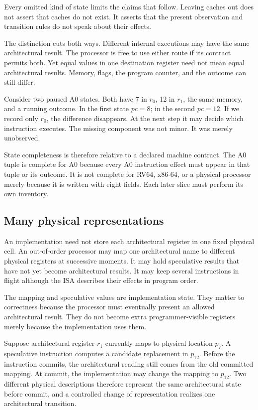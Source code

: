 \begin{warning}[title={An omitted component is a theorem premise}]
Every omitted kind of state limits the claims that follow. Leaving caches out
does not assert that caches do not exist. It asserts that the present
observation and transition rules do not speak about their effects.
\end{warning}

The distinction cuts both ways. Different internal executions may have the
same architectural result. The processor is free to use either route if its
contract permits both. Yet equal values in one destination register need not
mean equal architectural results. Memory, flags, the program counter, and the
outcome can still differ.

Consider two paused A0 states. Both have 7 in \(r_0\), 12 in \(r_1\), the same
memory, and a running outcome. In the first state \(pc=8\); in the second
\(pc=12\). If we record only \(r_0\), the difference disappears. At the next
step it may decide which instruction executes. The missing component was not
minor. It was merely unobserved.

State completeness is therefore relative to a declared machine contract. The
A0 tuple is complete for A0 because every A0 instruction effect must appear in
that tuple or its outcome. It is not complete for RV64, x86-64, or a physical
processor merely because it is written with eight fields. Each later slice
must perform its own inventory.

\subsection{Many physical representations}

An implementation need not store each architectural register in one fixed
physical cell. An out-of-order processor may map one architectural name to
different physical registers at successive moments. It may hold speculative results that
have not yet become architectural results. It may keep several instructions
in flight although the ISA describes their effects in program order.

The mapping and speculative values are implementation state. They matter to
correctness because the processor must eventually present an allowed
architectural result. They do not become extra programmer-visible registers
merely because the implementation uses them.

Suppose architectural register \(r_1\) currently maps to physical location
\(p_7\). A speculative instruction computes a candidate replacement in
\(p_{12}\). Before the instruction commits, the architectural reading still
comes from the old committed mapping. At commit, the implementation may change
the mapping to \(p_{12}\). Two different physical descriptions therefore
represent the same architectural state before commit, and a controlled change
of representation realizes one architectural transition.

